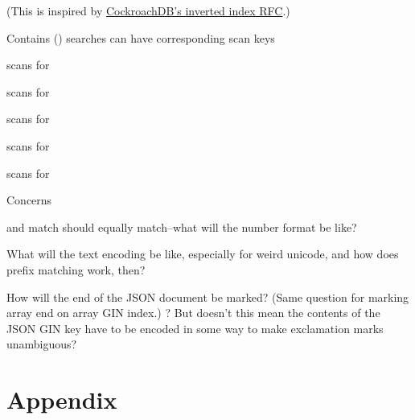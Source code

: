 \documentclass[11pt]{article}
\begin{document}
(This is inspired by
\href{https://github.com/cockroachdb/cockroach/blob/master/docs/RFCS/20171020_inverted_indexes.md}{CockroachDB's
inverted index RFC}.)

Contains () searches can have corresponding scan keys

\begin{oparts}
\item
  scans for 
\item
  scans for
\item
  scans for
\item
  scans for
\item
  scans for
\end{oparts}

Concerns

\begin{oparts}
\item
   and  match should equally match--what will the
  number format be like?
\item
  What will the text encoding be like, especially for weird unicode, and how
  does prefix matching work, then?
\item
  How will the end of the JSON document be marked? (Same question for marking
  array end on array GIN index.) ? But doesn't this mean
  the contents of the JSON GIN key have to be encoded in some way to make
  exclamation marks unambiguous?
\end{oparts}

\hypertarget{appendix}{%
\section{Appendix}\label{appendix}}




\end{document}
